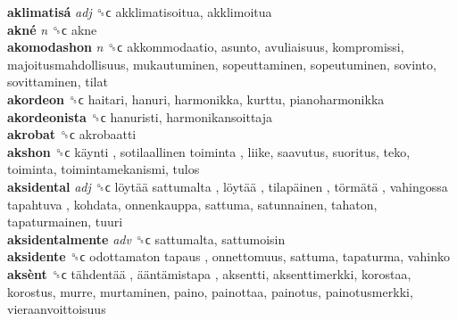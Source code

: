 \textbf{aklimatisá} \emph{adj}  ␝ϲ  akklimatisoitua, akklimoitua  \\
\textbf{akné} \emph{n}  ␝ϲ  akne  \\
\textbf{akomodashon} \emph{n}  ␝ϲ  akkommodaatio, asunto, avuliaisuus, kompromissi, majoitusmahdollisuus, mukautuminen, sopeuttaminen, sopeutuminen, sovinto, sovittaminen, tilat  \\
\textbf{akordeon} ␝ϲ  haitari, hanuri, harmonikka, kurttu, pianoharmonikka  \\
\textbf{akordeonista} ␝ϲ  hanuristi, harmonikansoittaja  \\
\textbf{akrobat} ␝ϲ  akrobaatti  \\
\textbf{akshon} ␝ϲ   käynti ,  sotilaallinen toiminta , liike, saavutus, suoritus, teko, toiminta, toimintamekanismi, tulos  \\
\textbf{aksidental} \emph{adj}  ␝ϲ   löytää sattumalta ,  löytää ,  tilapäinen ,  törmätä ,  vahingossa tapahtuva , kohdata, onnenkauppa, sattuma, satunnainen, tahaton, tapaturmainen, tuuri  \\
\textbf{aksidentalmente} \emph{adv}  ␝ϲ  sattumalta, sattumoisin  \\
\textbf{aksidente} ␝ϲ   odottamaton tapaus , onnettomuus, sattuma, tapaturma, vahinko  \\
\textbf{aksènt} ␝ϲ   tähdentää ,  ääntämistapa , aksentti, aksenttimerkki, korostaa, korostus, murre, murtaminen, paino, painottaa, painotus, painotusmerkki, vieraanvoittoisuus  \\
